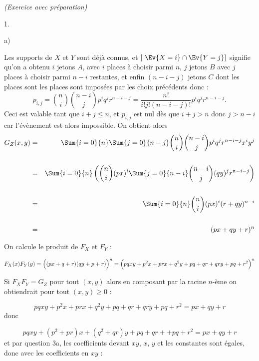 \documentclass[11pt]{article}%
\begin{document}
\begin{exercice}{\it (Exercice avec préparation)}
\begin{noliste}{1.}
\begin{noliste}{a)}
    \item Les supports de $X$ et $Y$ sont déjà connus, et $[ \ \Ev{X =
        i} \cap \Ev{Y = j} ]$ signifie qu'on a obtenu $i$ jetons $A$,
      avec $i$ places à choisir parmi $n$, $j$ jetons $B$ avec $j$
      places à choisir parmi $n-i$ restantes, et enfin $(n-i-j)$
      jetons $C$ dont les places sont les places sont imposées par les
      choix précédents donc :
      \[
      p_{i,j} = \binom{n}{i} \binom{n-i}{j} p^{i} q^{j} r^{n-i-j} = \frac{
        n! }{ i! j! (n-i-j)! } p^{i} q^{j} r^{n-i-j}.
      \]
      Ceci est valable tant que $i + j \leq n$, et $p_{i,j}$ est nul
      dès que $i + j > n$ donc $j > n-i$ car l'évènement est alors
      impossible. On obtient alors
      \begin{eqnarray*}
        G_{Z} ( x,y) & = & \Sum{i = 0}{n} \Sum{j = 0}{n-j} \binom{n}{i}
        \binom{n-i}{j} p^{i} q^{j} r^{n-i-j} x^{i} y^{j} \\
        \\
        & = & \Sum{i = 0}{n} \left( \binom{n}{i} ( p x )^{i}
          \Sum{j = 0}{n-i} \binom{n-i}{j} (q y )^{j} r^{n-i-j} \right)
        \\
        \\
        & = & \Sum{i = 0}{n} \binom{n}{i} ( p x )^{i} ( r + q y )^{n-i} \\
        \\
        & = & ( p x + q y + r )^{n} 
      \end{eqnarray*}
      


    \item On calcule le produit de $F_{X}$ et $F_{Y}$ :
      
      \[
      F_{X} ( x) F_{Y} (y) = \left( \rule{0cm}{0.4cm} (px + q + r) (qy + p
        + r ) \right)^{n} = \left( p q x y + p^{2} x + p r x + q^{2} y + p q
        + q r + q r y + p q + r^{2} \rule{0cm}{0.4cm} \right)^{n}
      \]
      
      Si $F_{X} F_{Y} = G_{Z}$ pour tout $(x,y)$ alors en composant par la
      racine $n$-ème on obtiendrait pour tout $(x,y) \geq 0$ :
      
      \[
      p q x y + p^{2} x + p r x + q^{2} y + p q + q r + q r y + p q + r^{2}
      = p x + q y + r
      \]
      donc
      
      \[
      p q x y + (p^{2} + pr ) x + (q^{2} + qr ) y + p q + q r + + p q + 
      r^{2} = p x + q y + r
      \]
      et par question 3a, les coefficients devant $xy$, $x$, $y$ et
      les constantes sont égales, donc avec les coefficients en $xy$ :
      

\end{noliste}
\end{noliste}
\end{exercice}
\end{document}
